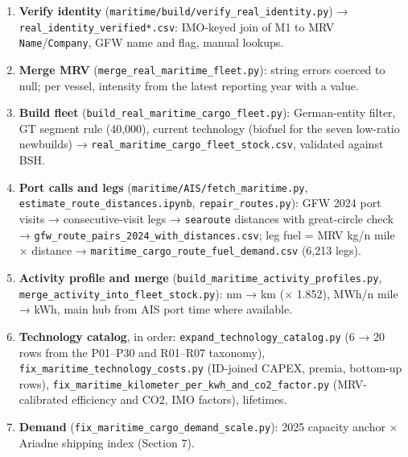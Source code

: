 \documentclass[11pt,a4paper]{article}
\begin{document}
\begin{enumerate}
\item{} \textbf{Verify identity} (\texttt{maritime/\allowbreak{}build/\allowbreak{}verify\_\allowbreak{}real\_\allowbreak{}identity.\allowbreak{}py}) → \texttt{real\_\allowbreak{}identity\_\allowbreak{}verified*.\allowbreak{}csv}: IMO-keyed join of M1 to MRV \texttt{Name}/\texttt{Company}, GFW name and flag, manual lookups.
\item{} \textbf{Merge MRV} (\texttt{merge\_\allowbreak{}real\_\allowbreak{}maritime\_\allowbreak{}fleet.\allowbreak{}py}): string errors coerced to null; per vessel, intensity from the latest reporting year with a value.
\item{} \textbf{Build fleet} (\texttt{build\_\allowbreak{}real\_\allowbreak{}maritime\_\allowbreak{}cargo\_\allowbreak{}fleet.\allowbreak{}py}): German-entity filter, GT segment rule (40,000), current technology (biofuel for the seven low-ratio newbuilds) → \texttt{real\_\allowbreak{}maritime\_\allowbreak{}cargo\_\allowbreak{}fleet\_\allowbreak{}stock.\allowbreak{}csv}, validated against BSH.
\item{} \textbf{Port calls and legs} (\texttt{maritime/\allowbreak{}AIS/\allowbreak{}fetch\_\allowbreak{}maritime.\allowbreak{}py}, \texttt{estimate\_\allowbreak{}route\_\allowbreak{}distances.\allowbreak{}ipynb}, \texttt{repair\_\allowbreak{}routes.\allowbreak{}py}): GFW 2024 port visits → consecutive-visit legs → \texttt{searoute} distances with great-circle check → \texttt{gfw\_\allowbreak{}route\_\allowbreak{}pairs\_\allowbreak{}2024\_\allowbreak{}with\_\allowbreak{}distances.\allowbreak{}csv}; leg fuel = MRV kg/n mile × distance → \texttt{maritime\_\allowbreak{}cargo\_\allowbreak{}route\_\allowbreak{}fuel\_\allowbreak{}demand.\allowbreak{}csv} (6,213 legs).
\item{} \textbf{Activity profile and merge} (\texttt{build\_\allowbreak{}maritime\_\allowbreak{}activity\_\allowbreak{}profiles.\allowbreak{}py}, \texttt{merge\_\allowbreak{}activity\_\allowbreak{}into\_\allowbreak{}fleet\_\allowbreak{}stock.\allowbreak{}py}): nm → km (× 1.852), MWh/n mile → kWh, main hub from AIS port time where available.
\item{} \textbf{Technology catalog}, in order: \texttt{expand\_\allowbreak{}technology\_\allowbreak{}catalog.\allowbreak{}py} (6 → 20 rows from the P01–P30 and R01–R07 taxonomy), \texttt{fix\_\allowbreak{}maritime\_\allowbreak{}technology\_\allowbreak{}costs.\allowbreak{}py} (ID-joined CAPEX, premia, bottom-up rows), \texttt{fix\_\allowbreak{}maritime\_\allowbreak{}kilometer\_\allowbreak{}per\_\allowbreak{}kwh\_\allowbreak{}and\_\allowbreak{}co2\_\allowbreak{}factor.\allowbreak{}py} (MRV-calibrated efficiency and CO2, IMO factors), lifetimes.
\item{} \textbf{Demand} (\texttt{fix\_\allowbreak{}maritime\_\allowbreak{}cargo\_\allowbreak{}demand\_\allowbreak{}scale.\allowbreak{}py}): 2025 capacity anchor × Ariadne shipping index (Section 7).
\end{enumerate}
\end{document}
